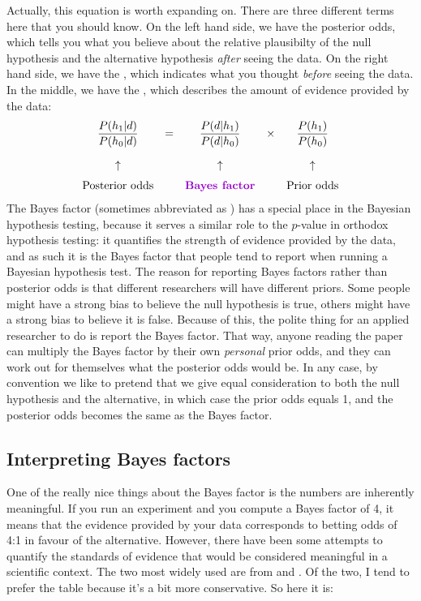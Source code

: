 Actually, this equation is worth expanding on. There are three different terms here that you should know. On the left hand side, we have the posterior odds, which tells you what you believe about the relative plausibilty of the null hypothesis and the alternative hypothesis {\it after} seeing the data. On the right hand side, we have the , which indicates what you thought {\it before} seeing the data. In the middle, we have the , which describes the amount of evidence provided by the data:
$$
\begin{array}{ccccc}\displaystyle
\frac{P(h_1 | d)}{P(h_0 | d)} &=& \displaystyle\frac{P(d|h_1)}{P(d|h_0)} &\times& \displaystyle\frac{P(h_1)}{P(h_0)} \\[6pt] \\[-2pt]
\uparrow && \uparrow && \uparrow \\[6pt]
\mbox{Posterior odds} && \mbox{\keyterm{Bayes factor}} && \mbox{Prior odds}
\end{array}
$$
The Bayes factor (sometimes abbreviated as ) has a special place in the Bayesian hypothesis testing, because it serves a similar role to the $p$-value in orthodox hypothesis testing: it quantifies the strength of evidence provided by the data, and as such it is the Bayes factor that people tend to report when running a Bayesian hypothesis test. The reason for reporting Bayes factors rather than posterior odds is that different researchers will have different priors. Some people might have a strong bias to believe the null hypothesis is true, others might have a strong bias to believe it is false. Because of this, the polite thing for an applied researcher to do is report the Bayes factor. That way, anyone reading the paper can multiply the Bayes factor by their own {\it personal} prior odds, and they can work out for themselves what the posterior odds would be. In any case, by convention we like to pretend that we give equal consideration to both the null hypothesis and the alternative, in which case the prior odds equals 1, and the posterior odds becomes the same as the Bayes factor.

\subsection{Interpreting Bayes factors}

One of the really nice things about the Bayes factor is the numbers are inherently meaningful. If you run an experiment and you compute a Bayes factor of 4, it means that the evidence provided by your data corresponds to betting odds of 4:1 in favour of the alternative. However, there have been some attempts to quantify the standards of evidence that would be considered meaningful in a scientific context. The two most widely used are from  and . Of the two, I tend to prefer the  table because it's a bit more conservative. So here it is:

